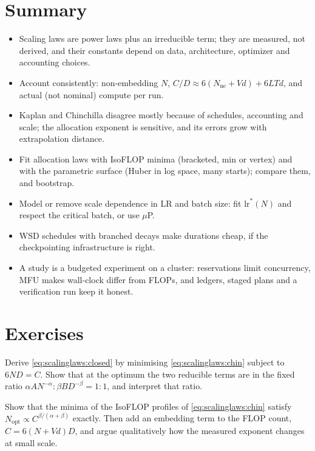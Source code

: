 \section{Summary}\label{sec:scalinglaws:summary}
\begin{itemize}
\item Scaling laws are power laws plus an irreducible term; they are measured, not derived, and
      their constants depend on data, architecture, optimizer and accounting choices.
\item Account consistently: non-embedding $N$, $C/D\approx6(N_{\text{ne}}+Vd)+6LTd$, and actual
      (not nominal) compute per run.
\item Kaplan and Chinchilla disagree mostly because of schedules, accounting and scale; the
      allocation exponent is sensitive, and its errors grow with extrapolation distance.
\item Fit allocation laws with IsoFLOP minima (bracketed, min or vertex) and with the parametric
      surface (Huber in log space, many starts); compare them, and bootstrap.
\item Model or remove scale dependence in LR and batch size: fit $\text{lr}^*(N)$ and respect
      the critical batch, or use $\mu$P.
\item WSD schedules with branched decays make durations cheap, if the checkpointing
      infrastructure is right.
\item A study is a budgeted experiment on a cluster: reservations limit concurrency, MFU makes
      wall-clock differ from FLOPs, and ledgers, staged plans and a verification run keep it
      honest.
\end{itemize}

\section{Exercises}\label{sec:scalinglaws:exercises}

\begin{exercise}\label{ex:scalinglaws:lagrange}
Derive \cref{eq:scalinglaws:closed} by minimising \cref{eq:scalinglaws:chin} subject to
$6ND=C$. Show that at the optimum the two reducible terms are in the fixed ratio
$\alpha A N^{-\alpha} : \beta B D^{-\beta} = 1:1$, and interpret that ratio.
\end{exercise}

\begin{exercise}
Show that the minima of the IsoFLOP profiles of \cref{eq:scalinglaws:chin} satisfy
$N_{\text{opt}}\propto C^{\beta/(\alpha+\beta)}$ exactly. Then add an embedding term to the FLOP
count, $C=6(N+Vd)D$, and argue qualitatively how the measured exponent changes at small scale.
\end{exercise}

